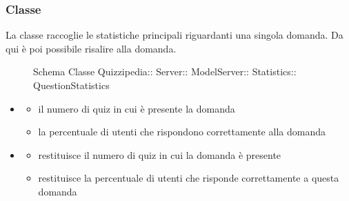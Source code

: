 \subsubsection{Classe }
La classe raccoglie le statistiche principali riguardanti una singola domanda. Da qui è poi possibile risalire alla domanda.
\begin{figure}[H]
\centering
\noindent{}
\caption[Schema Classe QuestionStatistics]{Schema Classe Quizzipedia:: Server:: ModelServer:: Statistics:: QuestionStatistics}
\end{figure}
\begin{itemize}
\item {}
\begin{itemize}
\item {}
\newline
il numero di quiz in cui è presente la domanda
\item {}
\newline
la percentuale di utenti che rispondono correttamente alla domanda
\end{itemize}
\item {}
\begin{itemize}
\item {}
\newline
restituisce il numero di quiz in cui la domanda è presente
\newline
\item {}
\newline
restituisce la percentuale di utenti che risponde correttamente a questa domanda
\newline
\end{itemize}
\end{itemize}
